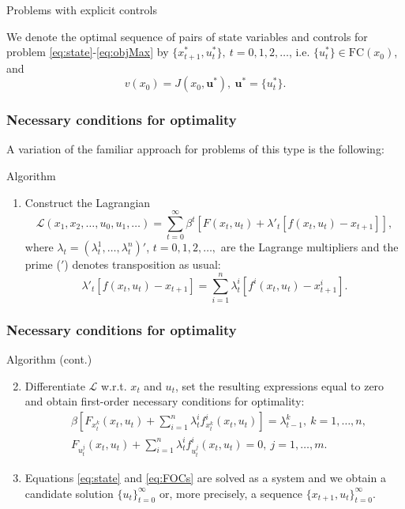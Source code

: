 \documentclass[10pt]{beamer}
\theoremstyle{definition}
\begin{document}
\begin{section}{Problems with explicit controls}
\begin{frame}[fragile]
We denote the optimal sequence of pairs of state variables and controls for problem \eqref{eq:state}-\eqref{eq:objMax} by $\{x^*_{t+1},u^*_t\},~t=0,1,2,\ldots$, i.e. $\{u^*_t\} \in \textrm{FC}(x_0)$, and $$v(x_0)=J(x_0,\mathbf{u^*}),~\mathbf{u^*}=\{u^*_t\}.$$
\end{frame}



\begin{frame}[fragile]
\frametitle{Necessary conditions for optimality}
A variation of the familiar approach for problems of this type is the following:
\begin{block}{Algorithm}
\begin{enumerate}
\item Construct the Lagrangian
\[\mathcal{L}(x_1,x_2,\ldots,u_0,u_1,\ldots) =
 \sum_{t=0}^{\infty}\beta^t \left[ F(x_t,u_t) + \lambda'_t 
[f(x_t,u_t)-x_{t+1}] \right],  \] where $\lambda_t=(\lambda^1_t,\ldots,\lambda^n_t)'$, $t=0,1,2,\ldots,$ are the Lagrange multipliers and the prime ($ ' $) denotes transposition as usual: $$\lambda'_t  [f(x_t,u_t)-x_{t+1}]
= \sum_{i=1}^n \lambda_t^i [f^i(x_t,u_t)-x^i_{t+1}].$$
\end{enumerate}
\end{block}
\end{frame}



\begin{frame}[fragile]
\frametitle{Necessary conditions for optimality}
\begin{block}{Algorithm (cont.)}
\begin{enumerate} \setcounter{enumi}{1}
\item Differentiate $\mathcal{L}$ w.r.t. $x_t$ and $u_t$, set the resulting expressions equal to zero and obtain first-order necessary conditions for optimality: \begin{equation}\begin{split}
& \beta \left[ F_{x_t^k}(x_t,u_t)+\sum_{i=1}^n \lambda_t^i f^i_{x_t^k}(x_t,u_t)\right] = \lambda^k_{t-1},~ k=1,\ldots,n, \\
& F_{u_t^j}(x_t,u_t)+ \sum_{i=1}^n \lambda_t^i f^i_{u_t^j}(x_t,u_t) = 0,~ j=1,\ldots,m.
\end{split}
\label{eq:FOCs}
\end{equation}
\item Equations \eqref{eq:state} and \eqref{eq:FOCs} are solved as a system and we obtain a candidate solution $\{u_t\}_{t=0}^\infty$ or, more precisely, a sequence
$\{x_{t+1},u_t\}_{t=0}^\infty$. 
\end{enumerate}
\end{block}\bigskip


\end{frame}
\end{section}
\end{document}
